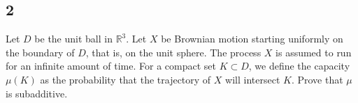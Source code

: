 \documentclass[12pt]{article}
\begin{document}

\subsection*{2}
\begin{tcolorbox}
  Let $D$ be the unit ball in $\mathbb{R}^3$. Let $X$ be Brownian motion starting uniformly on the boundary of $D$, that is, on the unit sphere. The process $X$ is assumed to run for an infinite amount of time. For a compact set $K \subset D$, we define the capacity $\mu(K)$ as the probability that the trajectory of $X$ will intersect $K$. Prove that $\mu$ is subadditive.
\end{tcolorbox}



\end{document}
